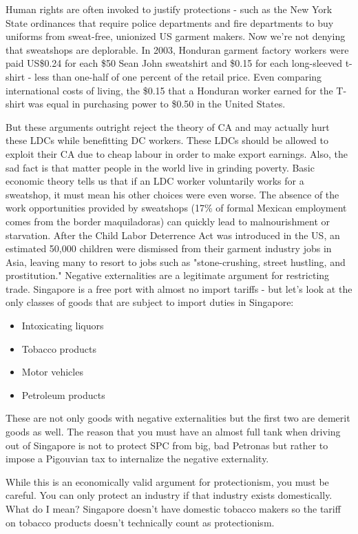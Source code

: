 Human rights are often invoked to justify protections - such as the New York State ordinances that require police departments and fire departments to buy uniforms from sweat-free, unionized US garment makers. Now we're not denying that sweatshops are deplorable. In 2003, Honduran garment factory workers were paid US\$0.24 for each \$50 Sean John sweatshirt and \$0.15 for each long-sleeved t-shirt - less than one-half of one percent of the retail price. Even comparing international costs of living, the \$0.15 that a Honduran worker earned for the T-shirt was equal in purchasing power to \$0.50 in the United States.

But these arguments outright reject the theory of CA and may actually hurt these LDCs while benefitting DC workers. These LDCs should be allowed to exploit their CA due to cheap labour in order to make export earnings. Also, the sad fact is that matter people in the world live in grinding poverty. Basic economic theory tells us that if an LDC worker voluntarily works for a sweatshop, it must mean his other choices were even worse. The absence of the work opportunities provided by sweatshops (17\% of formal Mexican employment comes from the border maquiladoras) can quickly lead to malnourishment or starvation. After the Child Labor Deterrence Act was introduced in the US, an estimated 50,000 children were dismissed from their garment industry jobs in Asia, leaving many to resort to jobs such as "stone-crushing, street hustling, and prostitution."
Negative externalities are a legitimate argument for restricting trade. Singapore is a free port with almost no import tariffs - but let's look at the only classes of goods that are subject to import duties in Singapore:
\begin{itemize}
\item Intoxicating liquors
\item Tobacco products
\item Motor vehicles
\item Petroleum products
\end{itemize}
These are not only goods with negative externalities but the first two are demerit goods as well. The reason that you must have an almost full tank when driving out of Singapore is not to protect SPC from big, bad Petronas but rather to impose a Pigouvian tax to internalize the negative externality.

While this is an economically valid argument for protectionism, you must be careful. You can only protect an industry if that industry exists domestically. What do I mean? Singapore doesn't have domestic tobacco makers so the tariff on tobacco products doesn't technically count as protectionism.
